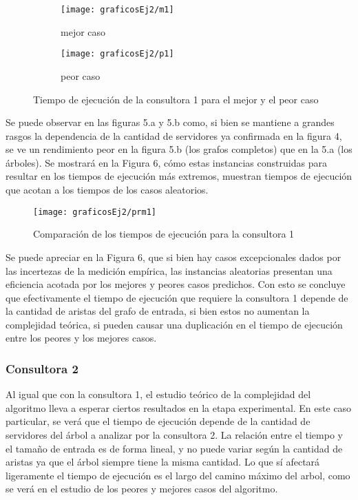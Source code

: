 \documentclass[A4paper,oneside,fleqn,11pt]{article}
\theoremstyle{definition}
\begin{document}
\begin{figure}[H] %
    \begin{subfigure}[b]{0.45\textwidth}
        \texttt{[image: graficosEj2/m1]}
        \caption[center]{mejor caso}
        \label{ni se pa que sirve esto}
    \end{subfigure}
    \begin{subfigure}[b]{0.45\textwidth}
        \texttt{[image: graficosEj2/p1]}
        \caption{peor caso}
        \label{ni se pa que sirve esto}
    \end{subfigure}
    \caption{Tiempo de ejecución de la consultora 1 para el mejor y el peor caso}
\end{figure}

Se puede observar en las figuras 5.a y 5.b como, si bien se mantiene a grandes rasgos la dependencia de la cantidad de servidores ya confirmada en la figura 4, se ve un rendimiento peor en la figura 5.b (los grafos completos) que en la 5.a (los árboles). Se mostrará en la Figura 6, cómo estas instancias construidas para resultar en los tiempos de ejecución más extremos, muestran tiempos de ejecución que acotan a los tiempos de los casos aleatorios.

\begin{figure}[H] %
    \texttt{[image: graficosEj2/prm1]}
    \label{ni se pa que sirve esto}
    \caption{Comparación de los tiempos de ejecución para la consultora 1}
\end{figure}

Se puede apreciar en la Figura 6, que si bien hay casos excepcionales dados por las incertezas de la medición empírica, las instancias aleatorias presentan una eficiencia acotada por los mejores y peores casos predichos. Con esto se concluye que efectivamente el tiempo de ejecución que requiere la consultora 1 depende de la cantidad de aristas del grafo de entrada, si bien estos no aumentan la complejidad teórica, si pueden causar una duplicación en el tiempo de ejecución entre los peores y los mejores casos.

\subsubsection{Consultora 2}

Al igual que con la consultora 1, el estudio teórico de la complejidad del algoritmo lleva a esperar ciertos resultados en la etapa experimental. En este caso particular, se verá que el tiempo de ejecución depende de la cantidad de servidores del árbol a analizar por la consultora 2. La relación entre el tiempo y el tamaño de entrada es de forma lineal, y no puede variar según la cantidad de aristas ya que el árbol siempre tiene la misma cantidad. Lo que sí afectará ligeramente el tiempo de ejecución es el largo del camino máximo del arbol, como se verá en el estudio de los peores y mejores casos del algoritmo.
\end{document}
